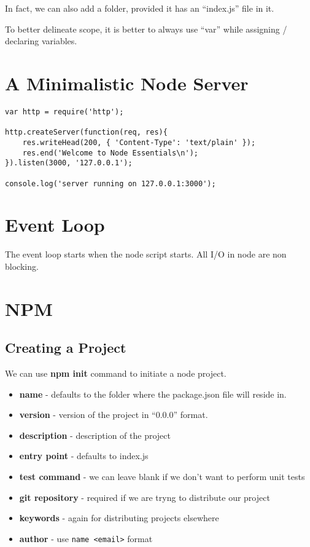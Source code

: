\documentclass[12pt, a4paper]{article}
\begin{document}
In fact, we can also add a folder, provided it has an ``index.js'' file in it.

To better delineate scope, it is better to always use ``var'' while assigning / declaring variables.


\section{A Minimalistic Node Server}
\begin{verbatim}
var http = require('http');

http.createServer(function(req, res){
	res.writeHead(200, { 'Content-Type': 'text/plain' });
	res.end('Welcome to Node Essentials\n');
}).listen(3000, '127.0.0.1');

console.log('server running on 127.0.0.1:3000');
\end{verbatim}


\section{Event Loop}
The event loop starts when the node script starts.
All I/O in node are non blocking.


\section{NPM}
\subsection{Creating a Project}
We can use \textbf{npm init} command to initiate a node project.
\begin{itemize}
\item \textbf{name} - defaults to the folder where the package.json file will reside in.
\item \textbf{version} - version of the project in ``0.0.0'' format.
\item \textbf{description} - description of the project
\item \textbf{entry point} - defaults to index.js
\item \textbf{test command} - we can leave blank if we don't want to perform unit tests
\item \textbf{git repository} - required if we are tryng to distribute our project
\item \textbf{keywords} - again for distributing projects elsewhere
\item \textbf{author} - use \verb|name <email>| format
\end{itemize}
\end{document}
